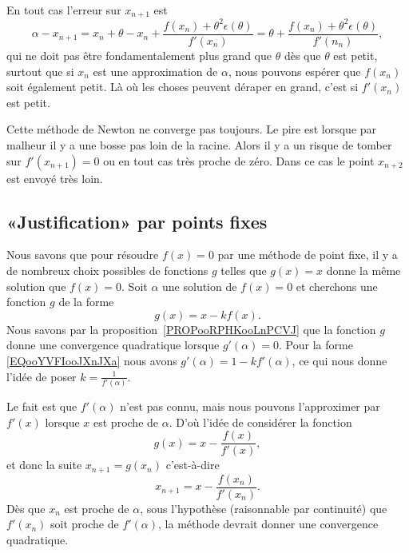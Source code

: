     En tout cas l'erreur sur \( x_{n+1}\) est
    \begin{equation}
        \alpha-x_{n+1}=x_n+\theta-x_n+\frac{ f(x_n)+\theta^2\epsilon(\theta) }{ f'(x_n) }=\theta+\frac{ f(x_n)+\theta^2\epsilon(\theta) }{ f'(n_n) },
    \end{equation}
    qui ne doit pas être fondamentalement plus grand que \( \theta\) dès que \( \theta\) est petit, surtout que si \( x_n\) est une approximation de \( \alpha\), nous pouvons espérer que \( f(x_n)\) soit également petit. Là où les choses peuvent déraper en grand, c'est si \( f'(x_n)\) est petit.

Cette méthode de Newton ne converge pas toujours. Le pire est lorsque par malheur il y a une bosse pas loin de la racine. Alors il y a un risque de tomber sur \( f'(x_{n+1})=0\) ou en tout cas très proche de zéro. Dans ce cas le point \( x_{n+2}\) est envoyé très loin.

\subsection{«Justification» par points fixes}
\label{SUBSECooIBLNooTujslO}

Nous savons que pour résoudre \( f(x)=0\) par une méthode de point fixe, il y a de nombreux choix possibles de fonctions \( g\) telles que \( g(x)=x\) donne la même solution que \( f(x)=0\). Soit \( \alpha\) une solution de \( f(x)=0\) et cherchons une fonction \( g\) de la forme
\begin{equation}        \label{EQooYVFIooJXnJXa}
    g(x)=x-kf(x).
\end{equation}
Nous savons par la proposition~\ref{PROPooRPHKooLnPCVJ} que la fonction \( g\) donne une convergence quadratique lorsque \( g'(\alpha)=0\). Pour la forme \eqref{EQooYVFIooJXnJXa} nous avons \( g'(\alpha)=1-kf'(\alpha)\), ce qui nous donne l'idée de poser \( k=\frac{1}{ f'(\alpha) }\).

Le fait est que \( f'(\alpha)\) n'est pas connu, mais nous pouvons l'approximer par \( f'(x)\) lorsque \( x\) est proche de \( \alpha\). D'où l'idée de considérer la fonction
\begin{equation}
    g(x)=x-\frac{ f(x) }{ f'(x) },
\end{equation}
et donc la suite \( x_{n+1}=g(x_n)\) c'est-à-dire
\begin{equation}
    x_{n+1}=x-\frac{ f(x_n) }{ f'(x_n) }.
\end{equation}
Dès que \( x_n\) est proche de \( \alpha\), sous l'hypothèse (raisonnable par continuité) que \( f'(x_n)\) soit proche de \( f'(\alpha)\), la méthode devrait donner une convergence quadratique.


